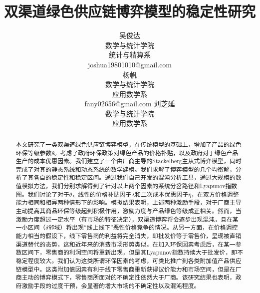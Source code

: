 \documentclass{article}
\title{双渠道绿色供应链博弈模型的稳定性研究}
\author{
    吴俊达\\数学与统计学院\\统计与精算系\\joshua19801010@gmail.com\\
    \And
    杨帆\\数学与统计学院\\应用数学系\\fany02656@gmail.com
    \And
    刘芝延\\数学与统计学院\\应用数学系\\
}
\begin{document}
\maketitle
\begin{abstract}
本文研究了一类双渠道绿色供应链博弈模型，在传统模型的基础上，增加了产品的绿色环保等级参数$\theta$。考虑了政府环保政策对绿色产品的价格补贴，以及政府对于绿色产品生产的成本优惠因素。我们建立了一个由厂商主导的Stackelberg主从式博弈模型，同时完成了对其的静态系统和动态系统的数学建模。我们求解了博弈模型的几个均衡解，分析了其各自的稳定性和稳定区间。通过我们自己开发的混沌分析工具，通过大规模的数值模拟方法，我们分别求解得到了针对以上两个因素的系统分岔路径和Lyapunov指数图。我们讨论了对于$\theta$，线性的价格补贴因子$\lambda$和二次成本优惠因子$\eta$，在双方价格调整能力相同和相异两种情形下的影响。模拟结果表明，上述两种激励手段，对于厂商主导主动提高其商品环保等级起到积极作用，激励力度与产品绿色等级成正相关。然而，当激励力度超过一定水平（有市场的特征决定），双渠道博弈将会逐步出现混沌，且在某一小区间（$\delta$邻域）将出现“线上线下”恶性价格竞争的情况。从另一方面，在价格调控能力相当的假设下，线下零售商的利益将完全消失，即批发价等于零售价，呈现被直销渠道替代的态势，这和近年来的消费市场形势类似。在加入环保因素考虑后，在某一参数区间下，零售商的利润空间将重新出现，但是其Lyapunov指数持续大于批发价，即不稳定程度较大。我们认为这类所谓环保因素的考虑，可类比推广到各类附加值产品供应链模型中。这类附加值因素有利于线下零售商重新获得议价能力和市场空间，但是在厂商主动的博弈模式下，零售商所面对的不确定性依然大于厂商。该研究结果也表明，政府激励手段的过度干预，会显著的增大市场的不确定性以及混沌程度。
\end{abstract}
\newpage
\end{document}
